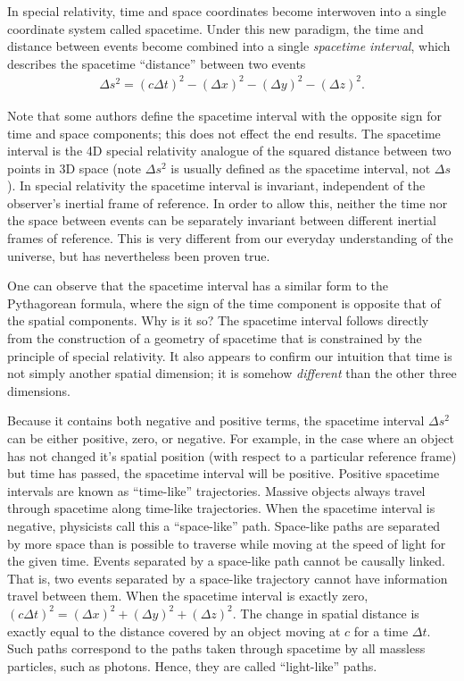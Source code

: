 \documentclass[titlepage,letterpaper,onecolumn,11pt,final]{report}
\numberwithin{equation}{section}
\numberwithin{figure}{section}
\begin{document}
In special relativity, time and space coordinates become interwoven into a single coordinate system called spacetime. Under this new paradigm, the time and distance between events become combined into a single \emph{spacetime interval}, which describes the spacetime ``distance'' between two events
\begin{gather}
	\label{eq:spacetime_interval}
	\Delta s^{2} = (c \Delta t)^{2} - (\Delta x)^{2} - (\Delta y)^{2} - (\Delta z)^{2} .
\end{gather}

Note that some authors define the spacetime interval with the opposite sign for time and space components; this does not effect the end results. The spacetime interval is the 4D special relativity analogue of the squared distance between two points in 3D space (note $\Delta s^{2}$ is usually defined as the spacetime interval, not $\Delta s$). In special relativity the spacetime interval is invariant, independent of the observer's inertial frame of reference. In order to allow this, neither the time nor the space between events can be separately invariant between different inertial frames of reference. This is very different from our everyday understanding of the universe, but has nevertheless been proven true. 

One can observe that the spacetime interval has a similar form to the Pythagorean formula, where the sign of the time component is opposite that of the spatial components. Why is it so? The spacetime interval follows directly from the construction of a geometry of spacetime that is constrained by the principle of special relativity. It also appears to confirm our intuition that time is not simply another spatial dimension; it is somehow \emph{different} than the other three dimensions.

Because it contains both negative and positive terms, the spacetime interval $\Delta s^{2}$ can be either positive, zero, or negative. For example, in the case where an object has not changed it's spatial position (with respect to a particular reference frame) but time has passed, the spacetime interval will be positive. Positive spacetime intervals are known as ``time-like'' trajectories. Massive objects always travel through spacetime along time-like trajectories. When the spacetime interval is negative, physicists call this a ``space-like'' path. Space-like paths are separated by more space than is possible to traverse while moving at the speed of light for the given time. Events separated by a space-like path cannot be causally linked. That is, two events separated by a space-like trajectory cannot have information travel between them. When the spacetime interval is exactly zero, $(c \Delta t)^{2} = (\Delta x)^{2} + (\Delta y)^{2} + (\Delta z)^{2}$. The change in spatial distance is exactly equal to the distance covered by an object moving at $c$ for a time $\Delta t$. Such paths correspond to the paths taken through spacetime by all massless particles, such as photons. Hence, they are called ``light-like'' paths.
\end{document}
